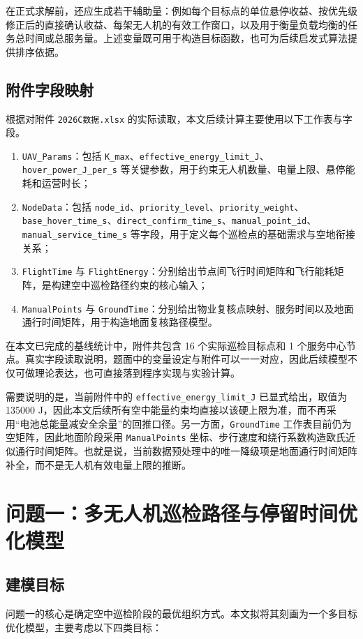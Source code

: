 \documentclass[12pt]{article}
\begin{document}
在正式求解前，还应生成若干辅助量：例如每个目标点的单位悬停收益、按优先级修正后的直接确认收益、每架无人机的有效工作窗口，以及用于衡量负载均衡的任务总时间或总服务量。上述变量既可用于构造目标函数，也可为后续启发式算法提供排序依据。

\subsection{附件字段映射}
根据对附件 \texttt{2026C数据.xlsx} 的实际读取，本文后续计算主要使用以下工作表与字段。

\begin{enumerate}
	\item \texttt{UAV\_Params}：包括 \texttt{K\_max}、\texttt{effective\_energy\_limit\_J}、\texttt{hover\_power\_J\_per\_s} 等关键参数，用于约束无人机数量、电量上限、悬停能耗和运营时长；
	\item \texttt{NodeData}：包括 \texttt{node\_id}、\texttt{priority\_level}、\texttt{priority\_weight}、\texttt{base\_hover\_time\_s}、\texttt{direct\_confirm\_time\_s}、\texttt{manual\_point\_id}、\texttt{manual\_service\_time\_s} 等字段，用于定义每个巡检点的基础需求与空地衔接关系；
	\item \texttt{FlightTime} 与 \texttt{FlightEnergy}：分别给出节点间飞行时间矩阵和飞行能耗矩阵，是构建空中巡检路径约束的核心输入；
	\item \texttt{ManualPoints} 与 \texttt{GroundTime}：分别给出物业复核点映射、服务时间以及地面通行时间矩阵，用于构造地面复核路径模型。
\end{enumerate}

在本文已完成的基线统计中，附件共包含 16 个实际巡检目标点和 1 个服务中心节点。真实字段读取说明，题面中的变量设定与附件可以一一对应，因此后续模型不仅可做理论表达，也可直接落到程序实现与实验计算。

需要说明的是，当前附件中的 \texttt{effective\_energy\_limit\_J} 已显式给出，取值为 135000 J，因此本文后续所有空中能量约束均直接以该硬上限为准，而不再采用“电池总能量减安全余量”的回推口径。另一方面，\texttt{GroundTime} 工作表目前仍为空矩阵，因此地面阶段采用 \texttt{ManualPoints} 坐标、步行速度和绕行系数构造欧氏近似通行时间矩阵。也就是说，当前数据预处理中的唯一降级项是地面通行时间矩阵补全，而不是无人机有效电量上限的推断。

\section{问题一：多无人机巡检路径与停留时间优化模型}

\subsection{建模目标}
问题一的核心是确定空中巡检阶段的最优组织方式。本文拟将其刻画为一个多目标优化模型，主要考虑以下四类目标：
\end{document}
